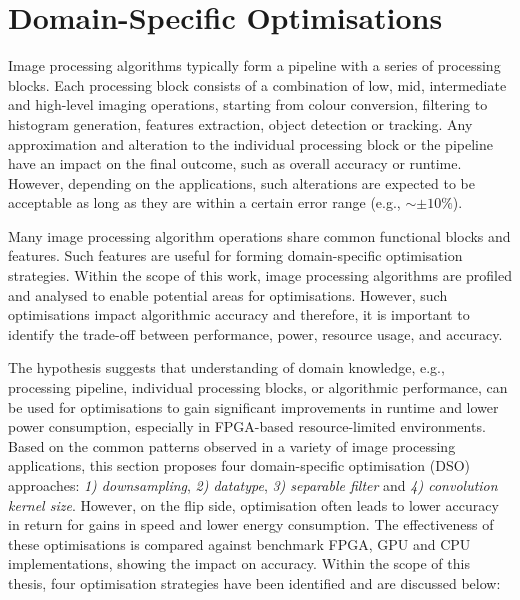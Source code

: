 \section{Domain-Specific Optimisations}
\label{sec:Domain-Specific Optimisations}
Image processing algorithms typically form a pipeline with a series of processing blocks. Each processing block consists of a combination of low, mid, intermediate and high-level imaging operations, starting from colour conversion, filtering to histogram generation, features extraction, object detection or tracking. Any approximation and alteration to the individual processing block or the pipeline have an impact on the final outcome, such as overall accuracy or runtime. However, depending on the applications, such alterations are expected to be acceptable as long as they are within a certain error range (e.g., $\sim \pm 10\%$). 

Many image processing algorithm operations share common functional blocks and features. Such features are useful for forming domain-specific optimisation strategies. Within the scope of this work, image processing algorithms are profiled and analysed to enable potential areas for optimisations. However, such optimisations impact algorithmic accuracy and therefore, it is important to identify the trade-off between performance, power, resource usage, and accuracy.

The hypothesis suggests that understanding of domain knowledge, e.g., processing pipeline, individual processing blocks, or algorithmic performance, can be used for optimisations to gain significant improvements in runtime and lower power consumption, especially in FPGA-based resource-limited environments. Based on the common patterns observed in a variety of image processing applications, this section proposes four domain-specific optimisation (DSO) approaches: \textit{1) downsampling}, \textit{2) datatype}, \textit{3) separable filter} and \textit{4) convolution kernel size}. However, on the flip side, optimisation often leads to lower accuracy in return for gains in speed and lower energy consumption. The effectiveness of these optimisations is compared against benchmark FPGA, GPU and CPU implementations, showing the impact on accuracy. Within the scope of this thesis, four optimisation strategies have been identified and are discussed below:

